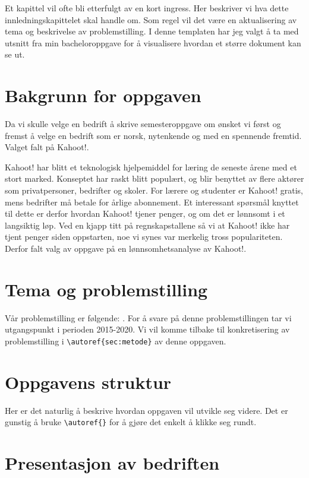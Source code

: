 
Et kapittel vil ofte bli etterfulgt av en kort ingress. Her beskriver vi hva dette innledningskapittelet skal handle om. Som regel vil det være en aktualisering av tema og beskrivelse av problemstilling. I denne templaten har jeg valgt å ta med utsnitt fra min bacheloroppgave for å visualisere hvordan et større dokument kan se ut.

\section{Bakgrunn for oppgaven}
Da vi skulle velge en bedrift å skrive semesteroppgave om ønsket vi først og fremst å velge en bedrift som er norsk, nytenkende og med en spennende fremtid. Valget falt på Kahoot!.

Kahoot! har blitt et teknologisk hjelpemiddel for læring de seneste årene med et stort marked. Konseptet har raskt blitt populært, og blir benyttet av flere aktører som privatpersoner, bedrifter og skoler. For lærere og studenter er Kahoot! gratis, mens bedrifter må betale for årlige abonnement. Et interessant spørsmål knyttet til dette er derfor hvordan Kahoot! tjener penger, og om det er lønnsomt i et langsiktig løp. Ved en kjapp titt på regnskapstallene så vi at Kahoot! ikke har tjent penger siden oppstarten, noe vi synes var merkelig tross populariteten. Derfor falt valg av oppgave på en lønnsomhetsanalyse av Kahoot!.

\section{Tema og problemstilling}
\label{sec:innledning:problemstilling}
Vår problemstilling er følgende:
. 
For å svare på denne problemstillingen tar vi utgangspunkt i perioden 2015-2020. Vi vil komme tilbake til konkretisering av problemstilling i \verb!\autoref{sec:metode}! av denne oppgaven.

\section{Oppgavens struktur}
Her er det naturlig å beskrive hvordan oppgaven vil utvikle seg videre. Det er gunstig å bruke \verb!\autoref{}! for å gjøre det enkelt å klikke seg rundt.


\section{Presentasjon av bedriften}

